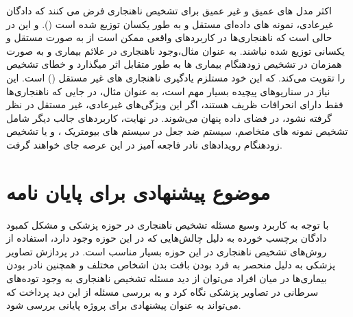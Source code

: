 \documentclass[12pt,a4paper]{report}
\theoremstyle{definition}
\theoremstyle{definition}
\begin{document}
اکثر مدل های عمیق و غیر عمیق برای تشخیص ناهنجاری فرض می کنند که دادگان غیرعادی، نمونه های داده‌ای مستقل و به طور یکسان توزیع شده است (). و این در حالی است که ناهنجاری‌ها در کاربرد‌های واقعی ممکن است از به صورت مستقل و یکسانی توزیع شده نباشند. به عنوان مثال،وجود ناهنجاری در علائم بیماری و به صورت همزمان در تشخیص زودهنگام بیماری ها به طور متقابل اثر میگذارد و خطای تشخیص را تقویت می‌کند. که این خود مستلزم یادگیری ناهنجاری های غیر مستقل () است\cite{Pang2019NonIIDOD}. این نیاز در سناریوهای پیچیده بسیار مهم است، به عنوان مثال، در جایی که ناهنجاری‌ها فقط دارای انحرافات ظریف هستند،‌ اگر این ویژگی‌های غیرعادی، غیر مستقل در نظر گرفته نشود، در فضای داده پنهان می‌شوند. در نهایت، کاربردهای جالب دیگر شامل تشخیص نمونه های متخاصم\cite{https://doi.org/10.48550/arxiv.1702.06280, https://doi.org/10.48550/arxiv.1802.03041}، سیستم ضد جعل در سیستم های بیومتریک \cite{KittlerJosef2020ASEf, PrezCabo2019DeepAD}، و یا تشخیص زودهنگام رویدادهای نادر فاجعه آمیز در این عرصه جای خواهند گرفت.
	\section{موضوع پیشنهادی برای پایان نامه}
با توجه به کاربرد وسیع مسئله تشخیص ناهنجاری در حوزه پزشکی و مشکل کمبود دادگان برچسب خورده به دلیل چالش‌هایی که در این حوزه وجود دارد، استفاده از روش‌های تشخیص ناهنجاری در این حوزه بسیار مناسب است. در پردازش تصاویر پزشکی به دلیل منحصر به فرد بودن بافت بدن اشخاص مختلف و همچنین نادر بودن بیماری‌ها در میان افراد می‌توان از دید مسئله تشخیص ناهنجاری به وجود توده‌های سرطانی در تصاویر پزشکی نگاه کرد و به بررسی مسئله از این دید پرداخت که می‌تواند به عنوان پیشنهادی برای پروژه پایانی بررسی شود.
	
	
	\newpage


\end{document}
